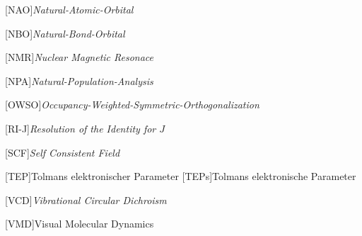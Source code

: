 \begin{acronym}[SEPSEP]
    [NAO]{\textit{Natural-Atomic-Orbital}}

    [NBO]{\textit{Natural-Bond-Orbital}}
    
    [NMR]{\textit{Nuclear Magnetic Resonace}}
        
    [NPA]{\textit{Natural-Population-Analysis}}
    
    [OWSO]{\textit{Occupancy-Weighted-Symmetric-Orthogonalization}}
    
    [RI-J]{\textit{Resolution of the Identity for $J$}}
    
	[SCF]{\textit{Self Consistent Field}}   

	[TEP]{Tolmans elektronischer Parameter}   
		{Tolmans elektronische Parameter}
		
	[VCD]{\textit{Vibrational Circular Dichroism}}

    

        
    [VMD]{Visual Molecular Dynamics}
\end{acronym}